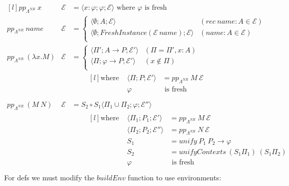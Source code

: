 \[\begin{matrix*}[l]
    pp_{\Lambda^{NR}} \ x & \mathcal{E} & = \langle x: \varphi ; \varphi ; \mathcal{E} \rangle \text{ where } \varphi \text{ is fresh} \\

    pp_{\Lambda^{NR}} \ name & \mathcal{E} & = \begin{cases}
        \langle \emptyset ; A ; \mathcal{E} \rangle & (rec \ name : A \in \mathcal{E} ) \\
        \langle \emptyset ; FreshInstance(\mathcal{E} \ name) ; \mathcal{E}  \rangle & (name : A \in \mathcal{E}) \\
    \end{cases} \\
    pp_{\Lambda^{NR}} \ (\lambda x . M) & \mathcal{E} & = \begin{cases}
        \langle \Pi'; A \to P ; \mathcal{E}' \rangle & (\Pi = \Pi', x:A) \\
        \langle \Pi; \varphi \to P ; \mathcal{E}' \rangle & (x \not\in \Pi) \\
    \end{cases} \\
    & & \qquad \begin{matrix*}[l]
        \text{where } & \langle \Pi; P ; \mathcal{E}' \rangle & = pp_{\Lambda^{NR}} \ M \ \mathcal{E} \\
        & \varphi & \text{ is fresh} \\
    \end{matrix*} \\
    pp_{\Lambda^{NR}} \ (M \ N) & \mathcal{E} & = S_2 \circ S_1 \langle \Pi_1 \cup \Pi_2 ; \varphi ; \mathcal{E}'' \rangle \\
    & & \qquad \begin{matrix*}[l]
        \text{where } & \langle \Pi_1 ; P_1 ; \mathcal{E}' \rangle & = pp_{\Lambda^{NR}} \ M \ \mathcal{E} \\
        & \langle \Pi_2 ; P_2 ; \mathcal{E}'' \rangle & = pp_{\Lambda^{NR}} \ N \ \mathcal{E} \\
        & S_1 & = unify \ P_1 \ P_2 \to \varphi \\
        & S_2 & = unifyContexts \ (S_1 \Pi_1) \ (S_1 \Pi_2) \\
        & \varphi & \text{ is fresh} \\
    \end{matrix*}
\end{matrix*}\]
For defs we must modify the $buildEnv$ function to use environments:
